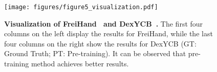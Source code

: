 \begin{figure}[t!]
    \begin{center}
    \texttt{[image: figures/figure5\_visualization.pdf]}
    \end{center}
    \vspace{-3mm}
    \caption{
    \textbf{Visualization of FreiHand~\citep{zimmermann:iccv19} and DexYCB~\citep{chao:cvpr21}.} 
    The first four columns on the left display the results for FreiHand, while the last four columns on the right show the results for DexYCB (GT: Ground Truth; PT: Pre-training). It can be observed that \Ours pre-training method achieves better results.
    }
    \label{fig:visualization}
\end{figure}